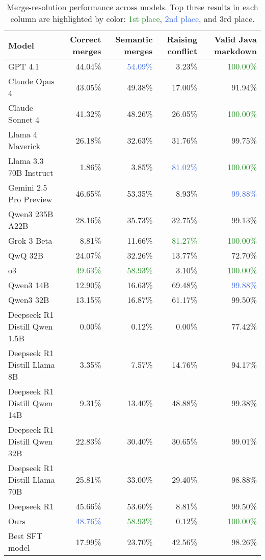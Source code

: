 \begin{table}[ht]
\centering
\begin{tabular}{lrrrr}
\toprule
Model & Correct merges & Semantic merges & Raising conflict & Valid Java markdown \\
\midrule
GPT 4.1 & 44.04\% & \textcolor{RoyalBlue}{54.09\%} & 3.23\% & \textcolor{ForestGreen}{100.00\%} \\
Claude Opus 4 & 43.05\% & 49.38\% & 17.00\% & 91.94\% \\
Claude Sonnet 4 & 41.32\% & 48.26\% & 26.05\% & \textcolor{ForestGreen}{100.00\%} \\
Llama 4 Maverick & 26.18\% & 32.63\% & 31.76\% & \textcolor{BurntOrange}{99.75\%} \\
Llama 3.3 70B Instruct & 1.86\% & 3.85\% & \textcolor{RoyalBlue}{81.02\%} & \textcolor{ForestGreen}{100.00\%} \\
Gemini 2.5 Pro Preview & \textcolor{BurntOrange}{46.65\%} & 53.35\% & 8.93\% & \textcolor{RoyalBlue}{99.88\%} \\
Qwen3 235B A22B & 28.16\% & 35.73\% & 32.75\% & 99.13\% \\
Grok 3 Beta & 8.81\% & 11.66\% & \textcolor{ForestGreen}{81.27\%} & \textcolor{ForestGreen}{100.00\%} \\
QwQ 32B & 24.07\% & 32.26\% & 13.77\% & 72.70\% \\
o3 & \textcolor{ForestGreen}{49.63\%} & \textcolor{ForestGreen}{58.93\%} & 3.10\% & \textcolor{ForestGreen}{100.00\%} \\
Qwen3 14B & 12.90\% & 16.63\% & \textcolor{BurntOrange}{69.48\%} & \textcolor{RoyalBlue}{99.88\%} \\
Qwen3 32B & 13.15\% & 16.87\% & 61.17\% & 99.50\% \\
Deepseek R1 Distill Qwen 1.5B & 0.00\% & 0.12\% & 0.00\% & 77.42\% \\
Deepseek R1 Distill Llama 8B & 3.35\% & 7.57\% & 14.76\% & 94.17\% \\
Deepseek R1 Distill Qwen 14B & 9.31\% & 13.40\% & 48.88\% & 99.38\% \\
Deepseek R1 Distill Qwen 32B & 22.83\% & 30.40\% & 30.65\% & 99.01\% \\
Deepseek R1 Distill Llama 70B & 25.81\% & 33.00\% & 29.40\% & 98.88\% \\
Deepseek R1 & 45.66\% & \textcolor{BurntOrange}{53.60\%} & 8.81\% & 99.50\% \\
Ours & \textcolor{RoyalBlue}{48.76\%} & \textcolor{ForestGreen}{58.93\%} & 0.12\% & \textcolor{ForestGreen}{100.00\%} \\
Best SFT model & 17.99\% & 23.70\% & 42.56\% & 98.26\% \\
\bottomrule
\end{tabular}
\caption{Merge-resolution performance across models. Top three results in each column are highlighted by color: \textcolor{ForestGreen}{1st place}, \textcolor{RoyalBlue}{2nd place}, and \textcolor{BurntOrange}{3rd place}.}
\end{table}
